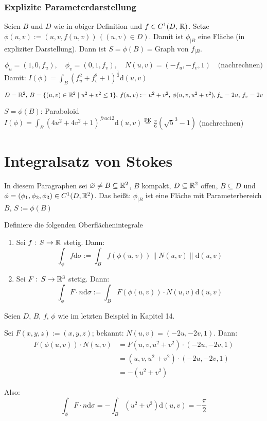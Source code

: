 \documentclass[a4paper,twoside,DIV15,BCOR12mm,chapterprefix=true,headings=onelinechapter]{scrbook}
\begin{document}
\subsection{Explizite Parameterdarstellung}
Seien \(B\) und \(D\) wie in obiger Definition und \(f\in C^{1}(D,\,\mathbb{R})\). Setze \(\phi(u,v):=(u,v,f(u,v))\,((u,v)\in D)\).
Damit ist \(\phi_{|B}\) eine Fl\"ache (in expliziter Darstellung).
Dann ist \(S=\phi(B)=\text{Graph von }f_{|B}\).

\[
\phi_{u}=(1,0,f_{u}),\quad \phi_{v}=(0,1,f_{v}),\quad N(u,v)=(-f_{u},-f_{v},1)\quad\text{(nachrechnen)}
\]
Damit: \(I(\phi)=\int_{B}{(f_{u}^{2}+f_{v}^{2}+1)^{\frac{1}{2}}\mathrm{d}(u,v)}\)

\begin{beispiel}
\(D=\mathbb{R}^{2},\,B=\{(u,v)\in\mathbb{R}^{2}\mid u^{2}+v^{2}\leq 1\},\,f(u,v):=u^{2}+v^{2},\,\phi(u,v,u^{2}+v^{2}),f_{u}=2u,\,f_{v}=2v\)

\(S=\phi(B)\): Paraboloid\\
\(I(\phi)=\int_{B}{(4u^{2}+4v^{2}+1)^{frac{1}{2}}\mathrm{d}(u,v)}\overset{\text{PK}}{=}\frac{\pi}{6}\left(\sqrt{5}^{3}-1\right)\) (nachrechnen)
\end{beispiel}

\chapter{Integralsatz von Stokes}

In diesem Paragraphen sei \(\varnothing\neq B\subseteq\mathbb{R}^{2}\), \(B\) kompakt, \(D\subseteq\mathbb{R}^{2}\) offen, \(B\subseteq D\)
und \(\phi=(\phi_{1},\phi_{2},\phi_{3})\in C^{1}(D,\mathbb{R}^{2})\). Das hei\ss t: \(\phi_{|B}\) ist eine Fl\"ache mit 
Parameterbereich \(B\), \(S:=\phi(B)\)

\begin{definition}
Definiere die folgenden Oberfl\"achenintegrale
\begin{enumerate}
\item Sei \(f:\,S\to\mathbb{R}\) stetig. Dann: 
\[
\int_{\phi}{f\mathrm{d}\sigma}:=\int_{B}{f(\phi(u,v))\lVert N(u,v)\rVert\mathrm{d}(u,v)}
\]
\item Sei \(F:\,S\to\mathbb{R}^{3}\) stetig. Dann:
\[
\int_{\phi}{F\cdot n\mathrm{d}\sigma}:=\int_{B}{F(\phi(u,v))\cdot N(u,v)\mathrm{d}(u,v)}
\]
\end{enumerate}
\end{definition}

\begin{beispiel}
Seien \(D,\,B,\,f,\,\phi\) wie im letzten Beispiel in Kapitel 14.	%

Sei \(F(x,y,z):=(x,y,z)\); bekannt: \(N(u,v)=(-2u,-2v,1)\). Dann:
\begin{align*}
F(\phi(u,v))\cdot N(u,v)&=F(u,v,u^{2}+v^{2})\cdot(-2u,-2v,1)\\
&=(u,v,u^{2}+v^{2})\cdot (-2u,-2v,1)\\
&=-(u^{2}+v^{2})
\end{align*}

Also: 
\[
\int_{\phi}{F\cdot n\mathrm{d}\sigma}=-\int_{B}{(u^{2}+v^{2})\mathrm{d}(u,v)}=-\frac{\pi}{2}
\]
\end{beispiel}
\end{document}
